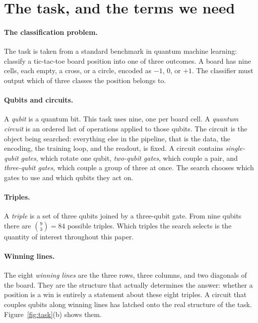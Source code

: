 \documentclass[11pt]{article}
\begin{document}
\section{The task, and the terms we need}
\label{sec:task}

\paragraph{The classification problem.}
The task is taken from a standard benchmark in quantum machine learning: classify
a tic-tac-toe board position into one of three outcomes. A board has nine cells,
each empty, a cross, or a circle, encoded as $-1$, $0$, or $+1$. The classifier
must output which of three classes the position belongs to.

\paragraph{Qubits and circuits.}
A \emph{qubit} is a quantum bit. This task uses nine, one per board cell. A
\emph{quantum circuit} is an ordered list of operations applied to those qubits.
The circuit is the object being searched: everything else in the pipeline, that
is the data, the encoding, the training loop, and the readout, is fixed. A
circuit contains \emph{single-qubit gates}, which rotate one qubit,
\emph{two-qubit gates}, which couple a pair, and \emph{three-qubit gates}, which
couple a group of three at once. The search chooses which gates to use and which
qubits they act on.

\paragraph{Triples.}
A \emph{triple} is a set of three qubits joined by a three-qubit gate. From nine
qubits there are $\binom{9}{3} = 84$ possible triples. Which triples the search
selects is the quantity of interest throughout this paper.

\paragraph{Winning lines.}
The eight \emph{winning lines} are the three rows, three columns, and two
diagonals of the board. They are the structure that actually determines the
answer: whether a position is a win is entirely a statement about these eight
triples. A circuit that couples qubits along winning lines has latched onto the
real structure of the task. Figure~\ref{fig:task}(b) shows them.
\end{document}
